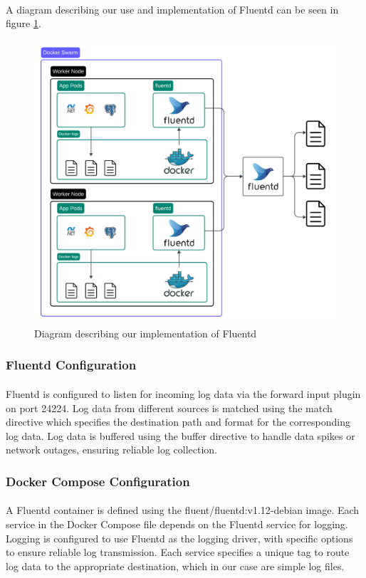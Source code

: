 \paragraph{} A diagram describing our use and implementation of Fluentd can be seen in figure \ref{fig:logging2}.
\begin{figure}[H]
	\centering
	\includegraphics[width=1\textwidth]{Logging2.png}
	\caption{Diagram describing our implementation of Fluentd}
	\label{fig:logging2}
\end{figure}

\subsubsection*{Fluentd Configuration}
\paragraph{} Fluentd is configured to listen for incoming log data via the forward input plugin on port 24224. Log data from different sources is matched using the match directive which specifies the destination path and format for the corresponding log data. Log data is buffered using the buffer directive to handle data spikes or network outages, ensuring reliable log collection.

\subsubsection*{Docker Compose Configuration}
\paragraph{} A Fluentd container is defined using the fluent/fluentd:v1.12-debian image. Each service in the Docker Compose file depends on the Fluentd service for logging. Logging is configured to use Fluentd as the logging driver, with specific options to ensure reliable log transmission. Each service specifies a unique tag to route log data to the appropriate destination, which in our case are simple log files.